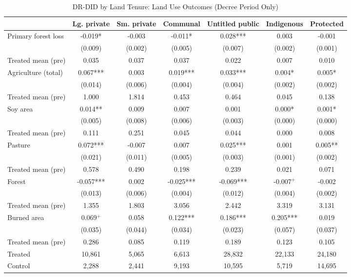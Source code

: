 \begin{table}[htbp]
\centering
\small
\caption{DR-DID by Land Tenure: Land Use Outcomes (Decree Period Only)}
\label{tab:did_drdid_landuse_byland_decree}
\begin{tabular}{lcccccc}
\toprule
 & Lg. private & Sm. private & Communal & Untitled public & Indigenous & Protected \\
\midrule
Primary forest loss & -0.019* & -0.003 & -0.011* & 0.028*** & 0.003 & -0.001 \\
 & (0.009) & (0.002) & (0.005) & (0.007) & (0.002) & (0.001) \\
Treated mean (pre) & 0.035 & 0.037 & 0.037 & 0.022 & 0.007 & 0.010 \\
[0.5em]
Agriculture (total) & 0.067*** & 0.003 & 0.019*** & 0.033*** & 0.004* & 0.005* \\
 & (0.014) & (0.006) & (0.004) & (0.004) & (0.002) & (0.002) \\
Treated mean (pre) & 1.000 & 1.814 & 0.453 & 0.464 & 0.045 & 0.138 \\
[0.5em]
Soy area & 0.014** & 0.009 & 0.007 & 0.001 & 0.000* & 0.001* \\
 & (0.005) & (0.008) & (0.006) & (0.003) & (0.000) & (0.000) \\
Treated mean (pre) & 0.111 & 0.251 & 0.045 & 0.044 & 0.000 & 0.008 \\
[0.5em]
Pasture & 0.072*** & -0.007 & 0.007 & 0.025*** & 0.001 & 0.005** \\
 & (0.021) & (0.011) & (0.005) & (0.003) & (0.001) & (0.002) \\
Treated mean (pre) & 0.578 & 0.490 & 0.198 & 0.239 & 0.021 & 0.071 \\
[0.5em]
Forest & -0.057*** & 0.002 & -0.025*** & -0.069*** & -0.007$^{+}$ & -0.002 \\
 & (0.013) & (0.006) & (0.004) & (0.012) & (0.004) & (0.002) \\
Treated mean (pre) & 1.355 & 1.803 & 3.056 & 2.442 & 3.319 & 3.131 \\
[0.5em]
Burned area & 0.069$^{+}$ & 0.058 & 0.122*** & 0.186*** & 0.205*** & 0.019 \\
 & (0.035) & (0.044) & (0.034) & (0.023) & (0.057) & (0.037) \\
Treated mean (pre) & 0.286 & 0.085 & 0.119 & 0.189 & 0.123 & 0.105 \\
\midrule
Treated & 10,861 & 5,065 & 6,613 & 28,832 & 22,133 & 24,180 \\
Control & 2,288 & 2,441 & 9,193 & 10,595 & 5,719 & 14,695 \\

\end{tabular}
\end{table}
